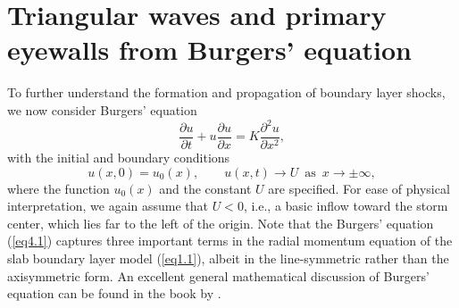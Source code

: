 \documentclass[10pt]{article}
\begin{document}
\section{Triangular waves and primary eyewalls
	 from Burgers' equation}                  %

     To further understand the formation and propagation
of boundary layer shocks, we now consider Burgers' equation
\begin{equation}                                 %
        \frac{\partial u}{\partial t}
     + u\frac{\partial u}{\partial x}
     = K\frac{\partial^2 u}{\partial x^2},
\label{eq4.1}
\end{equation}
with the initial and boundary conditions
\begin{equation}                                 %
        u(x,0) = u_0(x),  \qquad
        u(x,t) \to U \,\,\, \text{as}\,\,\, x \to \pm\infty,
\label{eq4.2}
\end{equation}
where the function $u_0(x)$ and the constant $U$ are specified. For ease of
physical interpretation, we again assume that $U<0$, i.e., a basic inflow
toward the storm center, which lies far to the left of the origin.
Note that the Burgers' equation (\ref{eq4.1}) captures three
important terms in the radial momentum equation of the slab boundary
layer model (\ref{eq1.1}), albeit in the line-symmetric rather than the
axisymmetric form. An excellent general mathematical discussion of Burgers'
equation can be found in the book by \citet{whitham74}.
\end{document}
